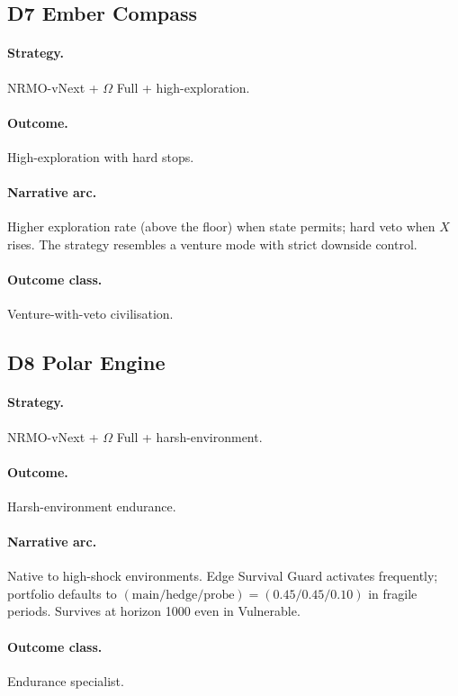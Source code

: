 \subsection{D7 Ember Compass}
\label{civ:d7}

\paragraph{Strategy.} NRMO-vNext + $\Omega$ Full +
high-exploration.
\paragraph{Outcome.} High-exploration with hard stops.
\paragraph{Narrative arc.}
Higher exploration rate (above the floor) when state permits;
hard veto when $X$ rises. The strategy resembles a venture mode
with strict downside control.
\paragraph{Outcome class.} Venture-with-veto civilisation.

\subsection{D8 Polar Engine}
\label{civ:d8}

\paragraph{Strategy.} NRMO-vNext + $\Omega$ Full +
harsh-environment.
\paragraph{Outcome.} Harsh-environment endurance.
\paragraph{Narrative arc.}
Native to high-shock environments. Edge Survival Guard
activates frequently; portfolio defaults to
$(\text{main}/\text{hedge}/\text{probe}) = (0.45/0.45/0.10)$ in
fragile periods. Survives at horizon 1000 even in Vulnerable.
\paragraph{Outcome class.} Endurance specialist.


